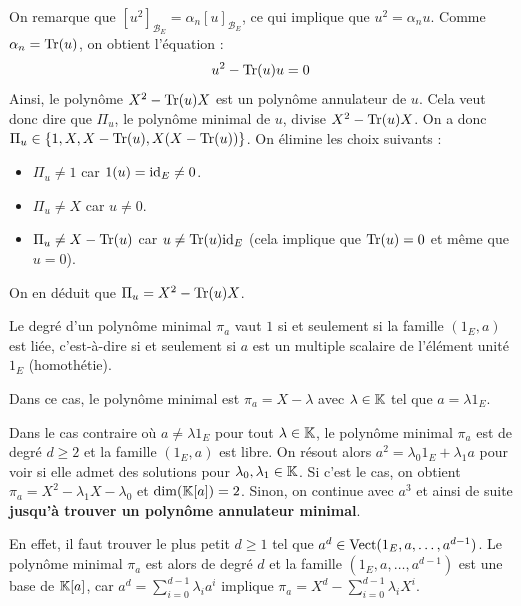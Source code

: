 \documentclass[11pt,a4paper]{report}
\begin{document}
\begin{correction}
\[    \]
    On remarque que $[u^2]_{\mathcal B_E} = \alpha_n [u]_{\mathcal B_E}$, ce qui implique que $u^2 = \alpha_n u$. Comme $\alpha_n = \mathrm{Tr}(u)$, on obtient l'équation :
    \[
        u^2 - \mathrm{Tr}(u) u = 0
    \]
    Ainsi, le polynôme $X^2 - \mathrm{Tr}(u) X$ est un polynôme annulateur de $u$. Cela veut donc dire que $\Pi_u$, le polynôme minimal de $u$, divise $X^2 - \mathrm{Tr}(u) X$. On a donc $\Pi_u \in \{1, X, X - \mathrm{Tr}(u), X(X - \mathrm{Tr}(u))\}$. On élimine les choix suivants :
    \begin{itemize}
        \item $\Pi_u \neq 1$ car $1(u) = \mathrm{id}_E \neq 0$.
        \item $\Pi_u \neq X$ car $u \neq 0$.
        \item $\Pi_u \neq X - \mathrm{Tr}(u)$ car $u \neq \mathrm{Tr}(u) \mathrm{id}_E$ (cela implique que $\mathrm{Tr}(u) = 0$ et même que $u = 0$).
    \end{itemize}
    On en déduit que $\Pi_u = X^2 - \mathrm{Tr}(u) X$.
\end{correction}

\begin{remark}
    Le degré d'un polynôme minimal $\pi_a$ vaut $1$ si et seulement si la famille $(1_E,a)$ est liée, c'est-à-dire si et seulement si $a$ est un multiple scalaire de l'élément unité $1_E$ (homothétie).

    Dans ce cas, le polynôme minimal est $\pi_a = X - \lambda$ avec $\lambda \in \mathbb{K}$ tel que $a = \lambda 1_E$.

    Dans le cas contraire où $a \ne \lambda 1_E$ pour tout $\lambda \in \mathbb{K}$, le polynôme minimal $\pi_a$ est de degré $d \ge 2$ et la famille $(1_E, a)$ est libre. On résout alors $a^2 = \lambda_0 1_E + \lambda_1 a$ pour voir si elle admet des solutions pour $\lambda_0, \lambda_1 \in \mathbb{K}$. Si c'est le cas, on obtient $\pi_a = X^2 - \lambda_1 X - \lambda_0$ et $\dim(\mathbb{K}[a]) = 2$. Sinon, on continue avec $a^3$ et ainsi de suite \textbf{jusqu'à trouver un polynôme annulateur minimal}.

    En effet, il faut trouver le plus petit $d \ge 1$ tel que $a^d \in \mathrm{Vect}(1_E, a, \dots, a^{d-1})$. Le polynôme minimal $\pi_a$ est alors de degré $d$ et la famille $(1_E, a, \dots, a^{d-1})$ est une base de $\mathbb{K}[a]$, car $a^d = \sum_{i=0}^{d-1} \lambda_i a^i$ implique $\pi_a = X^d - \sum_{i=0}^{d-1} \lambda_i X^i$.
\end{remark}
\end{document}

